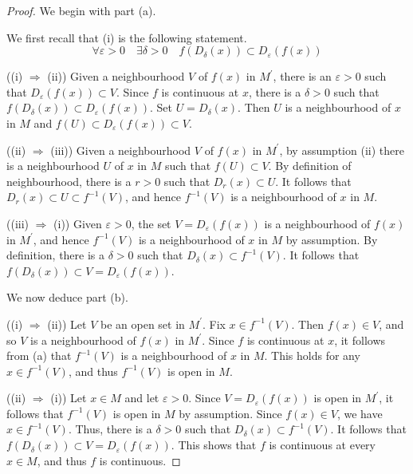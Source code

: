 \documentclass[a4paper,11pt]{article}
\begin{document}
\begin{proof}
    We begin with part (a). 
    
    We first recall that (i) is the following statement.
    \[
        \forall \varepsilon>0 \quad \exists \delta>0 \quad f\left(D_\delta(x)\right) \subset D_{\varepsilon}(f(x))
    \]

    ((i) $\Rightarrow$ (ii)) Given a neighbourhood $V$ of $f(x)$ in $M^{\prime}$, there is an $\varepsilon>0$ such that $D_{\varepsilon}(f(x)) \subset V$. Since $f$ is continuous at $x$, there is a $\delta>0$ such that $f\left(D_\delta(x)\right) \subset D_{\varepsilon}(f(x))$. Set $U=D_\delta(x)$. Then $U$ is a neighbourhood of $x$ in $M$ and $f(U) \subset D_{\varepsilon}(f(x)) \subset V$.

    ((ii) $\Rightarrow$ (iii)) Given a neighbourhood $V$ of $f(x)$ in $M^{\prime}$, by assumption (ii) there is a neighbourhood $U$ of $x$ in $M$ such that $f(U) \subset V$. By definition of neighbourhood, there is a $r>0$ such that $D_r(x) \subset U$. It follows that $D_r(x) \subset U \subset f^{-1}(V)$, and hence $f^{-1}(V)$ is a neighbourhood of $x$ in $M$.

    ((iii) $\Rightarrow$ (i)) Given $\varepsilon>0$, the set $V=D_{\varepsilon}(f(x))$ is a neighbourhood of $f(x)$ in $M^{\prime}$, and hence $f^{-1}(V)$ is a neighbourhood of $x$ in $M$ by assumption. By definition, there is a $\delta>0$ such that $D_\delta(x) \subset f^{-1}(V)$. It follows that $f\left(D_\delta(x)\right) \subset V=D_{\varepsilon}(f(x))$. 

    We now deduce part (b).

    ((i) $\Rightarrow$ (ii)) Let $V$ be an open set in $M^{\prime}$. Fix $x \in f^{-1}(V)$. Then $f(x) \in V$, and so $V$ is a neighbourhood of $f(x)$ in $M^{\prime}$. Since $f$ is continuous at $x$, it follows from (a) that $f^{-1}(V)$ is a neighbourhood of $x$ in $M$. This holds for any $x \in f^{-1}(V)$, and thus $f^{-1}(V)$ is open in $M$.

    ((ii) $\Rightarrow$ (i)) Let $x \in M$ and let $\varepsilon>0$. Since $V=D_{\varepsilon}(f(x))$ is open in $M^{\prime}$, it follows that $f^{-1}(V)$ is open in $M$ by assumption. Since $f(x) \in V$, we have $x \in f^{-1}(V)$. Thus, there is a $\delta>0$ such that $D_\delta(x) \subset f^{-1}(V)$. It follows that $f\left(D_\delta(x)\right) \subset V=D_{\varepsilon}(f(x))$. This shows that $f$ is continuous at every $x \in M$, and thus $f$ is continuous.
\end{proof}
\end{document}
